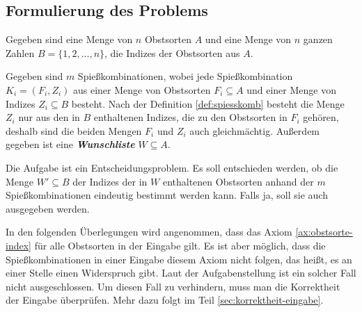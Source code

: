\subsection{Formulierung des Problems}\label{sec:formulierung}
Gegeben sind eine Menge von $n$ Obstsorten $A$ und eine Menge von $n$ ganzen Zahlen
$B = \{1, 2, ..., n\}$, die Indizes der Obstsorten aus $A$.





Gegeben sind $m$ Spießkombinationen, wobei jede Spießkombination $K_i = (F_i, Z_i)$
aus einer Menge von Obstsorten $F_i \subseteq A$ und einer Menge von Indizes $Z_i \subseteq B$ besteht. 
Nach der Definition \ref{def:spiesskomb} besteht die Menge $Z_i$ nur aus
den in $B$ enthaltenen Indizes, die zu den Obstsorten in $F_i$ gehören, deshalb sind die beiden Mengen
$F_i$ und $Z_i$ auch gleichmächtig. Außerdem gegeben ist eine \textit{\textbf{Wunschliste}} $W \subseteq A$.

Die Aufgabe ist ein Entscheidungsproblem. Es soll entschieden werden,
ob die Menge $W' \subseteq B$ der Indizes der in $W$ enthaltenen Obstsorten anhand der $m$ 
Spießkombinationen eindeutig bestimmt werden kann. Falls ja, soll sie auch ausgegeben werden.

In den folgenden Überlegungen wird angenommen, dass das Axiom \ref{ax:obstsorte-index} für alle
Obstsorten in der Eingabe gilt.
Es ist aber möglich, dass die Spießkombinationen in einer Eingabe diesem Axiom nicht folgen, das heißt,
es an einer Stelle einen Widerspruch gibt.
Laut der Aufgabenstellung ist ein solcher Fall nicht ausgeschlossen. 
Um diesen Fall zu verhindern, muss man die Korrektheit der Eingabe überprüfen. 
Mehr dazu folgt im Teil \ref{sec:korrektheit-eingabe}.
